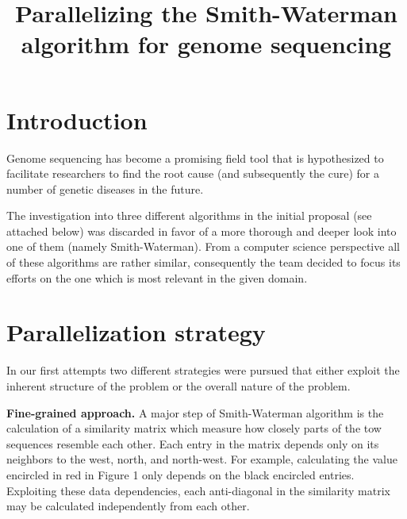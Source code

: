 \documentclass[letterpaper]{article}
\title{Parallelizing the Smith-Waterman algorithm for genome sequencing}
\newcommand{\mypar}[1]{{\bf #1.}}
\begin{document}
%
\maketitle
%

\section{Introduction}

Genome sequencing has become a promising field tool that is hypothesized to facilitate researchers to find the root cause (and subsequently the cure) for a number of genetic diseases in the future. \cite{Maekinen.2015}

The investigation into three different algorithms in the initial proposal (see attached below) was discarded in favor of a more thorough and deeper look into one of them (namely Smith-Waterman). From a computer science perspective all of these algorithms are rather similar, consequently the team decided to focus its efforts on the one which is most relevant in the given domain.

\section{Parallelization strategy}
In our first attempts two different strategies were pursued that either exploit the inherent structure of the problem or the overall nature of the problem.

\mypar{Fine-grained approach} A major step of Smith-Waterman algorithm is the calculation of a similarity matrix which measure how closely parts of the tow sequences resemble each other. Each entry in the matrix depends only on its neighbors to the west, north, and north-west. For example, calculating the value encircled in red in Figure 1 only depends on the black encircled entries. Exploiting these data dependencies, each anti-diagonal in the similarity matrix may be calculated independently from each other. 
\end{document}
